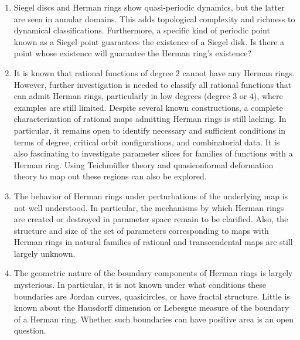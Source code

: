 \documentclass[12pt]{article}
\begin{document}
 \begin{enumerate}
 	\item Siegel discs and Herman rings show quasi-periodic dynamics, but the latter are seen in annular domains. This adds topological complexity and richness to dynamical classifications. Furthermore, a specific kind of periodic point known as a Siegel point guarantees the existence of a Siegel disk. Is there a point whose existence will guarantee the Herman ring's existence?
 	
 	\item It is known that rational functions of degree $2$ cannot have any Herman rings. However, further investigation is needed to classify all rational functions that can admit Herman rings, particularly in low degrees (degree $3$ or $4$), where examples are still limited. Despite several known constructions, a complete characterization of rational maps admitting Herman rings is still lacking. In particular, it remains open to identify necessary and sufficient conditions in terms of degree, critical orbit configurations, and combinatorial data. It is also fascinating to investigate parameter slices for families of functions with a Herman ring. Using Teichm\"{u}ller theory and quasiconformal deformation theory to map out these regions can also be explored.
	
	\item The behavior of Herman rings under perturbations of the underlying map is not well understood. In particular, the mechanisms by which Herman rings are created or destroyed in parameter space remain to be clarified. Also, the structure and size of the set of parameters corresponding to maps with Herman rings in natural families of rational and transcendental maps are still largely unknown.
	
	\item The geometric nature of the boundary components of Herman rings is largely mysterious. In particular, it is not known under what conditions these boundaries are Jordan curves, quasicircles, or have fractal structure. Little is known about the Hausdorff dimension or Lebesgue measure of the boundary of a Herman ring. Whether such boundaries can have positive area is an open question.
	

\end{enumerate}
\end{document}
